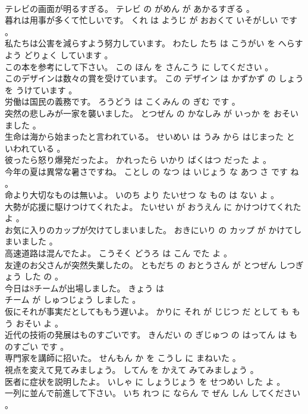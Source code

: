 \documentclass[8pt]{extreport}
\begin{document}
\begin{CJK}{UTF8}{min}
\\	テレビの画面が明るすぎる。	テレビ の がめん が あかるすぎる 。 
\\	暮れは用事が多くて忙しいです。	くれ は ようじ が おおくて いそがしい です 。 
\\	私たちは公害を減らすよう努力しています。	わたし たち は こうがい を へらす よう どりょく しています 。 
\\	この本を参考にして下さい。	この ほん を さんこう に してください 。 
\\	このデザインは数々の賞を受けています。	この デザイン は かずかず の しょう を うけています 。 
\\	労働は国民の義務です。	ろうどう は こくみん の ぎむ です 。 
\\	突然の悲しみが一家を襲いました。	とつぜん の かなしみ が いっか を おそいました 。 
\\	生命は海から始まったと言われている。	せいめい は うみ から はじまった と いわれている 。 
\\	彼ったら怒り爆発だったよ。	かれったら いかり ばくはつ だった よ 。 
\\	今年の夏は異常な暑さですね。	ことし の なつ は いじょう な あつ さ です ね 。 
\\	命より大切なものは無いよ。	いのち より たいせつ な もの は ない よ 。 
\\	大勢が応援に駆けつけてくれたよ。	たいせい が おうえん に かけつけてくれた よ 。 
\\	お気に入りのカップが欠けてしまいました。	おきにいり の カップ が かけてしまいました 。 
\\	高速道路は混んでたよ。	こうそく どうろ は こん でた よ 。 
\\	友達のお父さんが突然失業したの。	ともだち の おとうさん が とつぜん しつぎょう した の 。 
\\	今日は8チームが出場しました。	きょう は 
\\	チーム が しゅつじょう しました 。 
\\	仮にそれが事実だとしてももう遅いよ。	かりに それ が じじつ だ として も もう おそい よ 。 
\\	近代の技術の発展はものすごいです。	きんだい の ぎじゅつ の はってん は ものすごい です 。 
\\	専門家を講師に招いた。	せんもん か を こうし に まねいた 。 
\\	視点を変えて見てみましょう。	してん を かえて みてみましょう 。 
\\	医者に症状を説明したよ。	いしゃ に しょうじょう を せつめい した よ 。 
\\	一列に並んで前進して下さい。	いち れつ に ならん で ぜん しん してください 。 

\end{CJK}
\end{document}
